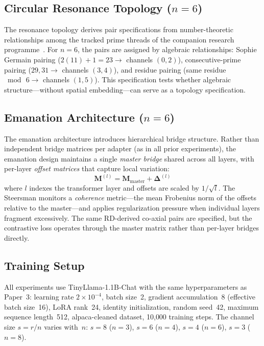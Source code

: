 \subsection{Circular Resonance Topology ($n = 6$)}
\label{sec:resonance_method}

The resonance topology derives pair specifications from
number-theoretic relationships among the tracked prime threads of the
companion research programme~\cite{bielec2026shape}. For $n = 6$, the
pairs are assigned by algebraic relationships: Sophie Germain pairing
($2(11) + 1 = 23 \to$ channels $(0, 2)$), consecutive-prime pairing
($29, 31 \to$ channels $(3, 4)$), and residue pairing (same residue
$\bmod\,6 \to$ channels $(1, 5)$). This specification tests whether
algebraic structure---without spatial embedding---can serve as a
topology specification.

\subsection{Emanation Architecture ($n = 6$)}
\label{sec:emanation_method}

The emanation architecture introduces hierarchical bridge structure.
Rather than independent bridge matrices per adapter (as in all prior
experiments), the emanation design maintains a single \emph{master
bridge} shared across all layers, with per-layer \emph{offset
matrices} that capture local variation:
\begin{equation}
  \mathbf{M}^{(l)} = \mathbf{M}_{\text{master}} +
    \boldsymbol{\Delta}^{(l)}
  \label{eq:emanation}
\end{equation}
where $l$ indexes the transformer layer and offsets are scaled by
$1/\sqrt{l}$. The Steersman monitors a \emph{coherence} metric---the
mean Frobenius norm of the offsets relative to the master---and
applies regularization pressure when individual layers fragment
excessively. The same RD-derived co-axial pairs are specified, but
the contrastive loss operates through the master matrix rather than
per-layer bridges directly.

\subsection{Training Setup}

All experiments use TinyLlama-1.1B-Chat with the same hyperparameters
as Paper~3: learning rate $2 \times 10^{-4}$, batch size~2, gradient
accumulation~8 (effective batch size~16), LoRA rank~24, identity
initialization, random seed~42, maximum sequence length~512,
alpaca-cleaned dataset, 10{,}000 training steps. The channel size
$s = r/n$ varies with~$n$: $s = 8$ ($n = 3$), $s = 6$ ($n = 4$),
$s = 4$ ($n = 6$), $s = 3$ ($n = 8$).

